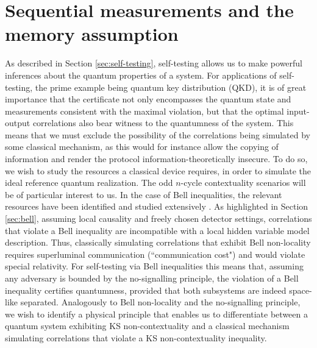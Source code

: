 \section{Sequential measurements and the memory assumption}
\label{sec:memoryass}
As described in Section \ref{sec:self-testing}, self-testing allows us to make powerful inferences about the quantum properties of a system. For applications of self-testing, the prime example being quantum key distribution (QKD), it is of great importance that the certificate not only encompasses the quantum state and measurements consistent with the maximal violation, but that the optimal input-output correlations also bear witness to the quantumness of the system. This means that we must exclude the possibility of the correlations being simulated by some classical mechanism, as this would for instance allow the copying of information and render the protocol information-theoretically insecure. To do so, we wish to study the resources a classical device requires, in order to simulate the ideal reference quantum realization. The odd $n$-cycle contextuality scenarios will be of particular interest to us. 
In the case of Bell inequalities, the relevant resources have been identified and studied extensively \cite{Brassard1999,Toner2003}. As highlighted in Section \ref{sec:bell}, assuming local causality and freely chosen detector settings, correlations that violate a Bell inequality are incompatible with a local hidden variable model description. Thus, classically simulating correlations that exhibit Bell non-locality requires superluminal communication (``communication cost") \cite{Toner2003} and would violate special relativity. For self-testing via Bell inequalities this means that, assuming any adversary is bounded by the no-signalling principle, the violation of a Bell inequality certifies quantumness, provided that both subsystems are indeed space-like separated. Analogously to Bell non-locality and the no-signalling principle, we wish to identify a physical principle that enables us to differentiate between a quantum system exhibiting KS non-contextuality and a classical mechanism simulating correlations that violate a KS non-contextuality inequality.
